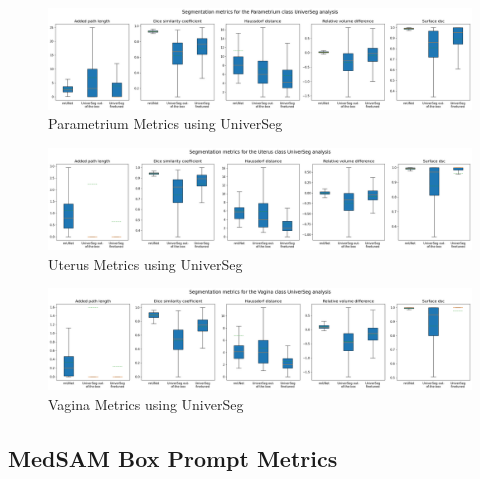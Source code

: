\documentclass[11pt,twoside]{report}
\begin{document}
\begin{landscape}
  \begin{figure}[H]
    \centering
    \includegraphics[width=\linewidth]{../../research/source/code/data/metrics/metricsparametrium_1_combinednotable_UniverSeg_analysis.png}
    \caption{Parametrium Metrics using UniverSeg}\label{fig:universeg-metrics-parametrium}
  \end{figure}

  \begin{figure}[H]
    \centering
    \includegraphics[width=\linewidth]{../../research/source/code/data/metrics/metricsuterus_1_combinednotable_UniverSeg_analysis.png}
    \caption{Uterus Metrics using UniverSeg}\label{fig:universeg-metrics-uterus}
  \end{figure}

  \begin{figure}[H]
    \centering
    \includegraphics[width=\linewidth]{../../research/source/code/data/metrics/metricsvagina_1_combinednotable_UniverSeg_analysis.png}
    \caption{Vagina Metrics using UniverSeg}\label{fig:universeg-metrics-vagina}
  \end{figure}

\end{landscape}

\subsection{MedSAM Box Prompt Metrics}\label{sect:medsam-Appendix}
\end{document}
